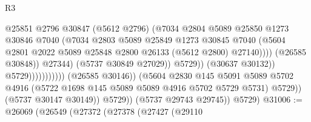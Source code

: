 \begin{lexlean}{R3}
\begin{coremodule}
                                                      @25851
                                                      @2796
                                                      @30847
                                                      (@5612 @2796)
                                                      (@7034
                                                        @2804
                                                        @5089
                                                        @25850
                                                        @1273
                                                        @30846
                                                        @7040
                                                        (@7034
                                                          @2803
                                                          @5089
                                                          @25849
                                                          @1273
                                                          @30845
                                                          @7040
                                                          (@5604
                                                            @2801
                                                            @2022
                                                            @5089
                                                            @25848
                                                            @2800
                                                            @26133
                                                            (@5612 @2800)
                                                            @27140))))
                                                    (@26585 @30848))
                                                  @27344)
                                                (@5737 @30849 @27029))
                                              @5729))
                                          (@30637 @30132))
                                        @5729)))))))))))
                  (@26585 @30146))
                (@5604
                  @2830
                  @145
                  @5091
                  @5089
                  @5702
                  @4916
                  (@5722 @1698 @145 @5089 @5089 @4916 @5702 @5729 @5731)
                  @5729))
              (@5737 @30147 @30149))
            @5729))
        (@5737 @29743 @29745))
      @5729)
@31006 := @26069
    (@26549
      (@27372
        (@27378
          (@27427
            (@29110

\end{coremodule}
\end{lexlean}
